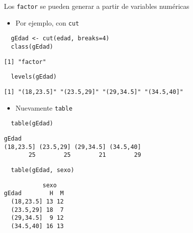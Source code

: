 \documentclass[xcolor={usenames,svgnames,dvipsnames}]{beamer}
\begin{document}
\begin{frame}[fragile,label=sec-1-6]{Los \texttt{factor} se pueden generar a partir de variables numéricas}
 \begin{itemize}
\item Por ejemplo, con \texttt{cut}
\end{itemize}
\lstset{language=R,label= ,caption= ,numbers=none}
\begin{lstlisting}
  gEdad <- cut(edad, breaks=4)
  class(gEdad)
\end{lstlisting}

\begin{verbatim}
[1] "factor"
\end{verbatim}

\lstset{language=R,label= ,caption= ,numbers=none}
\begin{lstlisting}
  levels(gEdad)
\end{lstlisting}

\begin{verbatim}
[1] "(18,23.5]" "(23.5,29]" "(29,34.5]" "(34.5,40]"
\end{verbatim}

\begin{itemize}
\item Nuevamente \texttt{table}
\end{itemize}
\lstset{language=R,label= ,caption= ,numbers=none}
\begin{lstlisting}
  table(gEdad)
\end{lstlisting}

\begin{verbatim}
gEdad
(18,23.5] (23.5,29] (29,34.5] (34.5,40] 
       25        25        21        29
\end{verbatim}

\lstset{language=R,label= ,caption= ,numbers=none}
\begin{lstlisting}
  table(gEdad, sexo)
\end{lstlisting}

\begin{verbatim}
           sexo
gEdad        H  M
  (18,23.5] 13 12
  (23.5,29] 18  7
  (29,34.5]  9 12
  (34.5,40] 16 13
\end{verbatim}
\end{frame}
\end{document}
